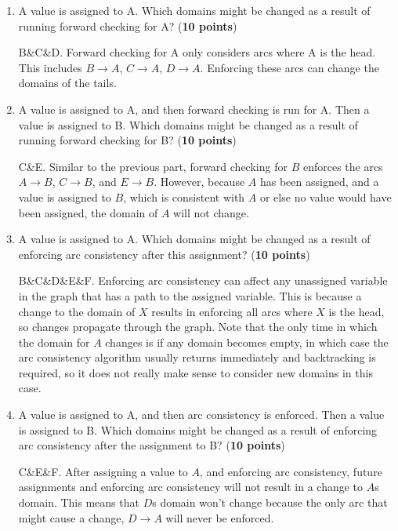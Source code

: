 \begin{enumerate}

\item A value is assigned to A. Which domains might be changed as a result of running forward checking for A? (\textbf{10 points})

{\color{red} B\&C\&D. Forward checking for A only considers arcs where A is the head. This includes $B\rightarrow A$, $C\rightarrow A$, $D\rightarrow A$. Enforcing these arcs can change the domains of the tails.
}

\item A value is assigned to A, and then forward checking is run for A. Then a value is assigned to B. Which domains might be changed as a result of running forward checking for B? (\textbf{10 points})

{\color{red} C\&E. Similar to the previous part, forward checking for $B$ enforces the arcs $A\rightarrow B$, $C\rightarrow B$, and $E\rightarrow B$. However, because $A$ has been assigned, and a value is assigned to $B$, which is consistent with $A$ or else no value would have been assigned, the domain of $A$ will not change.}

\item A value is assigned to A. Which domains might be changed as a result of enforcing arc consistency after this assignment? (\textbf{10 points})

{\color{red} B\&C\&D\&E\&F. Enforcing arc consistency can affect any unassigned variable in the graph that has a path to the assigned variable. This is because a change to the domain of $X$ results in enforcing all arcs where $X$ is the head, so changes propagate through the graph. Note that the only time in which the domain for $A$ changes is if any domain becomes empty, in which case the arc consistency algorithm usually returns immediately and backtracking is required, so it does not really make sense to consider new domains in this case.}


\item A value is assigned to A, and then arc consistency is enforced. Then a value is assigned to B. Which domains might be changed as a result of enforcing arc consistency after the assignment to B? (\textbf{10 points})

{\color{red} C\&E\&F. After assigning a value to $A$, and enforcing arc consistency, future assignments and enforcing arc consistency will not result in a change to $A$s domain. This means that $D$s domain won't change because the only arc that might cause a change, $D\rightarrow A$ will never be enforced.}

\end{enumerate}

